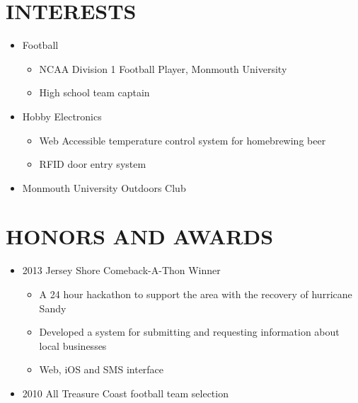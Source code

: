 \documentclass{res}
\begin{document}
\begin{resume}
\section{INTERESTS}          
    \begin{itemize}
        \item Football
            \begin{itemize}
                \item NCAA Division 1 Football Player, Monmouth University
                \item High school team captain
            \end{itemize}
        \item Hobby Electronics
            \begin{itemize}
                \item Web Accessible temperature control system for homebrewing beer
                \item RFID door entry system
            \end{itemize}
        \item Monmouth University Outdoors Club
    \end{itemize}
 

\section{HONORS AND AWARDS}          
    \begin{itemize}
        \item 2013 Jersey Shore Comeback-A-Thon Winner
            \begin{itemize}
                \item A 24 hour hackathon to support the area with the recovery of hurricane Sandy
                \item Developed a system for submitting and requesting information about local businesses
                \item Web, iOS and SMS interface
            \end{itemize}
        \item 2010 All Treasure Coast football team selection
    \end{itemize}
 
 
\end{resume}
\end{document}
